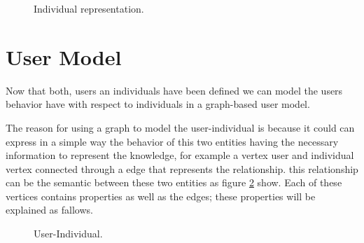 \begin{figure}
\captionsetup{justification=centering,margin=2cm}
\centering
\setlength\fboxsep{0pt}
\setlength\fboxrule{0.7pt}
\caption{Individual representation.}
\label{fig:graph}
\end{figure}


\section{User Model}
Now that both, users an individuals have been defined we can
model the users behavior have with respect to individuals in a graph-based user
model.

The reason for using a graph to model the user-individual is because it could
can express in a simple way the behavior of this two entities having the
necessary information  to represent the knowledge,  for example a vertex user
and individual vertex connected through a edge that  represents the
relationship. this relationship can be the semantic  between these two entities
as figure \ref{fig:User-Individual} show. Each of these vertices contains
properties as well as the edges; these properties will be explained as fallows.

\begin{figure}
\captionsetup{justification=centering,margin=2cm}
\centering
\setlength\fboxsep{0pt}
\setlength\fboxrule{0.7pt}
\caption{User-Individual.}
\label{fig:User-Individual}
\end{figure}

